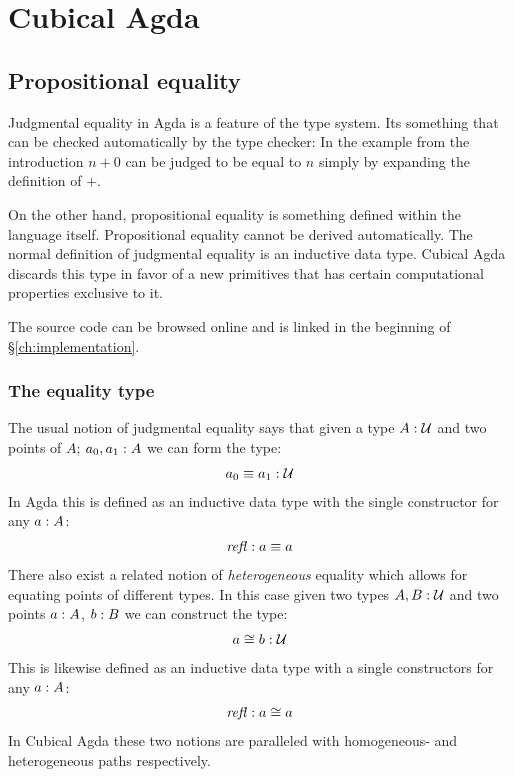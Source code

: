 \chapter{Cubical Agda}
\section{Propositional equality}
Judgmental equality in Agda is a feature of the type system. Its something that
can be checked automatically by the type checker: In the example from the
introduction $n + 0$ can be judged to be equal to $n$ simply by expanding the
definition of $+$.

On the other hand, propositional equality is something defined within the
language itself. Propositional equality cannot be derived automatically. The
normal definition of judgmental equality is an inductive data type. Cubical Agda
discards this type in favor of a new primitives that has certain computational
properties exclusive to it.

The source code can be browsed online and is linked in the beginning
of \S\ref{ch:implementation}.

\subsection{The equality type}
The usual notion of judgmental equality says that given a type $A \mathrel{:} \mathcal{U}$ and
two points of $A$; $a_0, a_1 \mathrel{:} A$ we can form the type:
%
\begin{align}
  a_0 \equiv a_1 \mathrel{:} \mathcal{U}
\end{align}
%
In Agda this is defined as an inductive data type with the single constructor
for any $a \mathrel{:} A$:
%
\begin{align}
  \refl \tp a \equiv a
\end{align}
%
There also exist a related notion of \emph{heterogeneous} equality which allows
for equating points of different types. In this case given two types $A, B \mathrel{:}
\mathcal{U}$ and two points $a \mathrel{:} A$, $b \mathrel{:} B$ we can construct the type:
%
\begin{align}
  a \cong b \mathrel{:} \mathcal{U}
\end{align}
%
This is likewise defined as an inductive data type with a single constructors
for any $a \mathrel{:} A$:
%
\begin{align}
  \refl \tp a \cong a
\end{align}
%
In Cubical Agda these two notions are paralleled with homogeneous- and
heterogeneous paths respectively.
%
